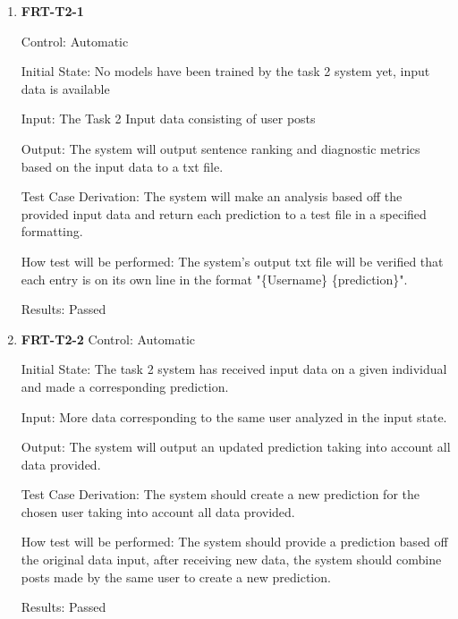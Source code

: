 \documentclass[12pt, titlepage]{article}
\begin{document}
\begin{enumerate}
\item \textbf{FRT-T2-1}


Control: Automatic


Initial State: No models have been trained by the task 2 system yet, input data is available


Input: The Task 2 Input data consisting of user posts


Output: The system will output sentence ranking and diagnostic metrics based on the input data to a txt file.


Test Case Derivation: The system will make an analysis based off the provided input data and return each prediction to a test file in a specified formatting.


How test will be performed: The system's output txt file will be verified that each entry is on its own line in the format "\{Username\} \{prediction\}".


Results: Passed


\item \textbf{FRT-T2-2}
Control: Automatic


Initial State: The task 2 system has received input data on a given individual and made a corresponding prediction.


Input: More data corresponding to the same user analyzed in the input state.


Output: The system will output an updated prediction taking into account all data provided.


Test Case Derivation: The system should create a new prediction for the chosen user taking into account all data provided.


How test will be performed: The system should provide a prediction based off the original data input, after receiving new data, the system should combine posts made by the same user to create a new prediction.


Results: Passed
\end{enumerate}
\end{document}

